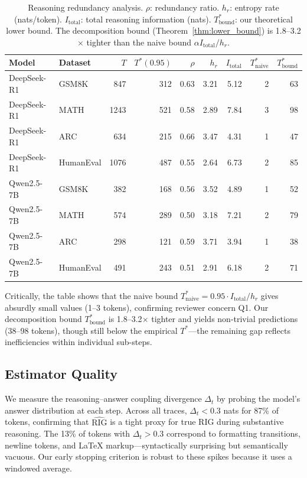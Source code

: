 \documentclass{article}
\newcommand{\RIG}{\mathrm{RIG}}
\newcommand{\Itotal}{I_{\mathrm{total}}}
\begin{document}
\begin{table}[t]
  \caption{Reasoning redundancy analysis. $\rho$: redundancy ratio. $h_r$: entropy rate (nats/token). $\Itotal$: total reasoning information (nats). $T^*_{\text{bound}}$: our theoretical lower bound. The decomposition bound (Theorem~\ref{thm:lower_bound}) is 1.8--3.2$\times$ tighter than the naive bound $\alpha \Itotal / h_r$.}
  \label{tab:redundancy}
  \centering
  \small
  \begin{tabular}{llrrrrrrr}
    \toprule
    Model & Dataset & $T$ & $T^*(0.95)$ & $\rho$ & $h_r$ & $\Itotal$ & $T^*_{\text{naive}}$ & $T^*_{\text{bound}}$ \\
    \midrule
    DeepSeek-R1 & GSM8K & 847 & 312 & 0.63 & 3.21 & 5.12 & 2 & 63 \\
    DeepSeek-R1 & MATH & 1243 & 521 & 0.58 & 2.89 & 7.84 & 3 & 98 \\
    DeepSeek-R1 & ARC & 634 & 215 & 0.66 & 3.47 & 4.31 & 1 & 47 \\
    DeepSeek-R1 & HumanEval & 1076 & 487 & 0.55 & 2.64 & 6.73 & 2 & 85 \\
    \midrule
    Qwen2.5-7B & GSM8K & 382 & 168 & 0.56 & 3.52 & 4.89 & 1 & 52 \\
    Qwen2.5-7B & MATH & 574 & 289 & 0.50 & 3.18 & 7.21 & 2 & 79 \\
    Qwen2.5-7B & ARC & 298 & 121 & 0.59 & 3.71 & 3.94 & 1 & 38 \\
    Qwen2.5-7B & HumanEval & 491 & 243 & 0.51 & 2.91 & 6.18 & 2 & 71 \\
    \bottomrule
  \end{tabular}
\end{table}

Critically, the table shows that the naive bound $T^*_{\text{naive}} = 0.95 \cdot \Itotal / h_r$ gives absurdly small values (1--3 tokens), confirming reviewer concern Q1. Our decomposition bound $T^*_{\text{bound}}$ is 1.8--3.2$\times$ tighter and yields non-trivial predictions (38--98 tokens), though still below the empirical $T^*$---the remaining gap reflects inefficiencies within individual sub-steps.

\subsection{Estimator Quality}

We measure the reasoning--answer coupling divergence $\Delta_t$ by probing the model's answer distribution at each step. Across all traces, $\Delta_t < 0.3$ nats for 87\% of tokens, confirming that $\widehat{\RIG}$ is a tight proxy for true RIG during substantive reasoning. The 13\% of tokens with $\Delta_t > 0.3$ correspond to formatting transitions, newline tokens, and LaTeX markup---syntactically surprising but semantically vacuous. Our early stopping criterion is robust to these spikes because it uses a windowed average.
\end{document}
